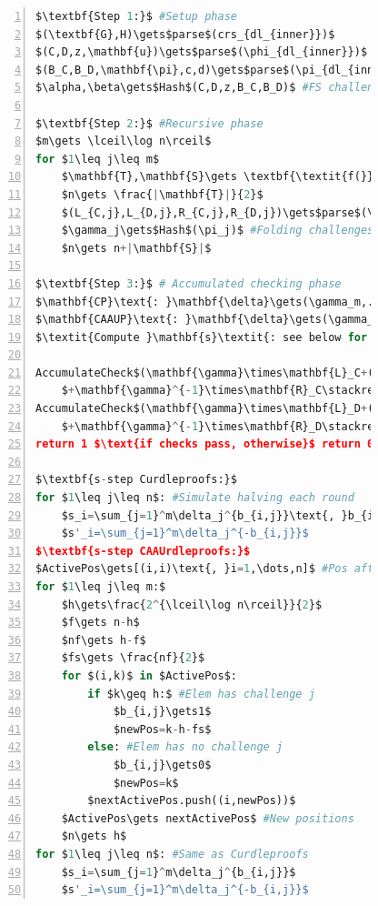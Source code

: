 \begin{figure}[!htb]
        \begin{lstlisting}[language=Python,mathescape=true,label={lst:ipa-verifier-optimized},numbers=left,caption={Optimized verifier computation for CAAU-IPA in CAAUrdleproofs},captionpos=b,frame=single]
$\textbf{Step 1:}$ #Setup phase
$(\textbf{G},H)\gets$parse$(crs_{dl_{inner}})$
$(C,D,z,\mathbf{u})\gets$parse$(\phi_{dl_{inner}})$
$(B_C,B_D,\mathbf{\pi},c,d)\gets$parse$(\pi_{dl_{inner}})$
$\alpha,\beta\gets$Hash$(C,D,z,B_C,B_D)$ #FS challenges

$\textbf{Step 2:}$ #Recursive phase
$m\gets \lceil\log n\rceil$
for $1\leq j\leq m$
    $\mathbf{T},\mathbf{S}\gets \textbf{\textit{f(}}n\textbf{\textit{)}}$ #Scheme function
    $n\gets \frac{|\mathbf{T}|}{2}$
    $(L_{C,j},L_{D,j},R_{C,j},R_{D,j})\gets$parse$(\pi_j)$ #Proof elem
    $\gamma_j\gets$Hash$(\pi_j)$ #Folding challenges
    $n\gets n+|\mathbf{S}|$

$\textbf{Step 3:}$ # Accumulated checking phase
$\mathbf{CP}\text{: }\mathbf{\delta}\gets(\gamma_m,...,\gamma_1)$ #Construction difference
$\mathbf{CAAUP}\text{: }\mathbf{\delta}\gets(\gamma_1,...,\gamma_m)$
$\textit{Compute }\mathbf{s}\textit{: see below for difference}$

AccumulateCheck$(\mathbf{\gamma}\times\mathbf{L}_C+(B_C+\alpha C+(\alpha^2z)H)$
    $+\mathbf{\gamma}^{-1}\times\mathbf{R}_C\stackrel{?}{=}(c\mathbf{s}\| cd\beta)\times(\mathbf{G}\| H))$
AccumulateCheck$(\mathbf{\gamma}\times\mathbf{L}_D+(B_D+\alpha D)$
    $+\mathbf{\gamma}^{-1}\times\mathbf{R}_D\stackrel{?}{=}d(\mathbf{s'}\circ\mathbf{u})\times\mathbf{G})$
return 1 $\text{if checks pass, otherwise}$ return 0

$\textbf{s-step Curdleproofs:}$
for $1\leq j\leq n$: #Simulate halving each round
    $s_i=\sum_{j=1}^m\delta_j^{b_{i,j}}\text{, }b_{i,j}\in\{0,1\}\text{ s.t. }i=\sum_{j=1}^mb_{i,j}2^j$
    $s'_i=\sum_{j=1}^m\delta_j^{-b_{i,j}}$
$\textbf{s-step CAAUrdleproofs:}$
$ActivePos\gets[(i,i)\text{, }i=1,\dots,n]$ #Pos after round
for $1\leq j\leq m:$
    $h\gets\frac{2^{\lceil\log n\rceil}}{2}$
    $f\gets n-h$
    $nf\gets h-f$
    $fs\gets \frac{nf}{2}$
    for $(i,k)$ in $ActivePos$:
        if $k\geq h:$ #Elem has challenge j
            $b_{i,j}\gets1$
            $newPos=k-h-fs$
        else: #Elem has no challenge j
            $b_{i,j}\gets0$
            $newPos=k$
        $nextActivePos.push((i,newPos))$
    $ActivePos\gets nextActivePos$ #New positions
    $n\gets h$
for $1\leq j\leq n$: #Same as Curdleproofs
    $s_i=\sum_{j=1}^m\delta_j^{b_{i,j}}$
    $s'_i=\sum_{j=1}^m\delta_j^{-b_{i,j}}$
        \end{lstlisting}
    \label{fig:ipa-verifier-optimized}
\end{figure}

